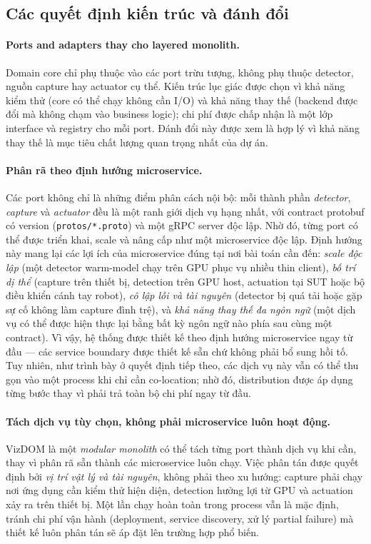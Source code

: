\documentclass[11pt,a4paper]{article}
\newcommand{\code}[1]{\texttt{#1}}
\begin{document}
\subsection{Các quyết định kiến trúc và đánh đổi}
\paragraph{Ports and adapters thay cho layered monolith.} Domain core chỉ phụ thuộc
vào các port trừu tượng, không phụ thuộc detector, nguồn capture hay actuator cụ
thể. Kiến trúc lục giác được chọn vì khả năng kiểm thử (core có thể chạy không cần
I/O) và khả năng thay thế (backend được đổi mà không chạm vào business logic); chi
phí được chấp nhận là một lớp interface và registry cho mỗi port. Đánh đổi này được
xem là hợp lý vì khả năng thay thế là mục tiêu chất lượng quan trọng nhất của dự án.

\paragraph{Phân rã theo định hướng microservice.} Các port không chỉ là những
điểm phân cách nội bộ: mỗi thành phần \emph{detector}, \emph{capture} và
\emph{actuator} đều là một ranh giới dịch vụ hạng nhất, với contract protobuf có
version (\code{protos/*.proto}) và một gRPC server độc lập. Nhờ đó, từng port có
thể được triển khai, scale và nâng cấp như một microservice độc lập. Định hướng
này mang lại các lợi ích của microservice đúng tại nơi bài toán cần đến:
\emph{scale độc lập} (một detector warm-model chạy trên GPU phục vụ nhiều thin
client), \emph{bố trí dị thể} (capture trên thiết bị, detection trên GPU host,
actuation tại SUT hoặc bộ điều khiển cánh tay robot), \emph{cô lập lỗi và tài
nguyên} (detector bị quá tải hoặc gặp sự cố không làm capture đình trệ), và
\emph{khả năng thay thế đa ngôn ngữ} (một dịch vụ có thể được hiện thực lại bằng
bất kỳ ngôn ngữ nào phía sau cùng một contract). Vì vậy, hệ thống được thiết kế
theo định hướng microservice ngay từ đầu --- các service boundary được thiết kế
sẵn chứ không phải bổ sung hồi tố. Tuy nhiên, như trình bày ở quyết định tiếp theo,
các dịch vụ này vẫn có thể thu gọn vào một process khi chỉ cần co-location; nhờ
đó, distribution được áp dụng từng bước thay vì phải trả toàn bộ chi phí ngay từ
đầu.

\paragraph{Tách dịch vụ tùy chọn, không phải microservice luôn hoạt động.} VizDOM là
một \emph{modular monolith} có thể tách từng port thành dịch vụ khi cần, thay vì
phân rã sẵn thành các microservice luôn chạy. Việc phân tán được quyết định bởi
\emph{vị trí vật lý và tài nguyên}, không phải theo xu hướng: capture phải chạy nơi
ứng dụng cần kiểm thử hiện diện, detection hưởng lợi từ GPU và actuation xảy ra trên
thiết bị. Một lần chạy hoàn toàn trong process vẫn là mặc định, tránh chi phí vận
hành (deployment, service discovery, xử lý partial failure) mà thiết kế luôn phân
tán sẽ áp đặt lên trường hợp phổ biến.
\end{document}
